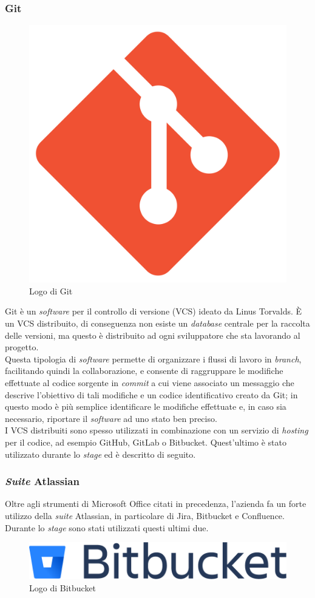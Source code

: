 \subsubsection{Git}

\begin{figure}[H]
    \centering 
    \includegraphics[width=0.2\columnwidth]{images/loghi/Git.png} 
    \caption{Logo di Git}
\end{figure}

Git è un \textit{software} per il controllo di versione (VCS) ideato da Linus Torvalds. È un VCS distribuito, di conseguenza non esiste un \textit{database} centrale per la raccolta delle versioni, ma questo è distribuito ad ogni sviluppatore che sta lavorando al progetto.\\
Questa tipologia di \textit{software} permette di organizzare i flussi di lavoro in \textit{branch}, facilitando quindi la collaborazione, e consente di raggruppare le modifiche effettuate al codice sorgente in \textit{commit} a cui viene associato un messaggio che descrive l'obiettivo di tali modifiche e un codice identificativo creato da Git; in questo modo è più semplice identificare le modifiche effettuate e, in caso sia necessario, riportare il \textit{software} ad uno stato ben preciso.\\
I VCS distribuiti sono spesso utilizzati in combinazione con un servizio di \textit{hosting} per il codice, ad esempio GitHub, GitLab o Bitbucket. Quest'ultimo è stato utilizzato durante lo \textit{stage} ed è descritto di seguito.


\subsubsection{\textit{Suite} Atlassian}

Oltre agli strumenti di Microsoft Office citati in precedenza, l'azienda fa un forte utilizzo della \textit{suite} Atlassian, in particolare di Jira, Bitbucket e Confluence. Durante lo \textit{stage} sono stati utilizzati questi ultimi due.

\vspace{6mm}

\begin{figure}[H]
    \centering 
    \includegraphics[width=0.4\columnwidth]{images/loghi/bitbucket.png} 
    \caption{Logo di Bitbucket}
\end{figure}

